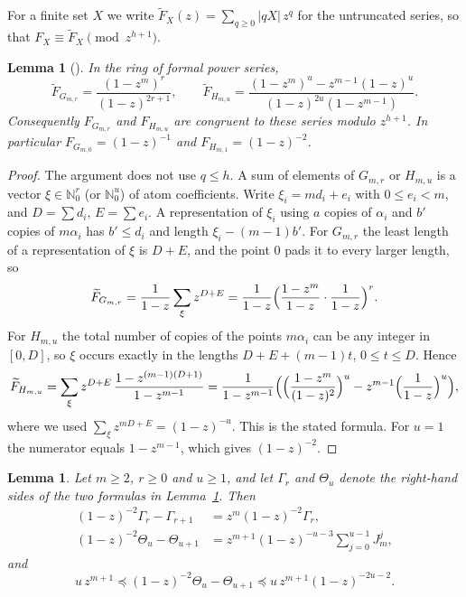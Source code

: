 \documentclass[11pt]{amsart}
\newtheorem{lemma}[theorem]{Lemma}
\theoremstyle{definition}
\theoremstyle{remark}
\numberwithin{equation}{section}
\newcommand{\N}{\mathbb{N}}
\newcommand{\cle}{\preceq}
\begin{document}
For a finite set $X$ we write $\widetilde F_X(z)=\sum_{q\ge0}|qX|\,z^q$ for the untruncated series, so that $F_X\equiv\widetilde F_X\pmod{z^{h+1}}$.

\begin{lemma}[{\cite[Lemmas~3.3 and~3.4]{PC}}]\label{lem:oGH}
In the ring of formal power series,
\[
\widetilde F_{G_{m,r}}=\frac{(1-z^m)^r}{(1-z)^{2r+1}},\qquad \widetilde F_{H_{m,u}}=\frac{(1-z^m)^u-z^{m-1}(1-z)^u}{(1-z)^{2u}(1-z^{m-1})}.
\]
Consequently $F_{G_{m,r}}$ and $F_{H_{m,u}}$ are congruent to these series modulo $z^{h+1}$. In particular $F_{G_{m,0}}=(1-z)^{-1}$ and $F_{H_{m,1}}=(1-z)^{-2}$.
\end{lemma}

\begin{proof}
The argument does not use $q\le h$. A sum of elements of $G_{m,r}$ or $H_{m,u}$ is a vector $\xi\in\N_0^r$ (or $\N_0^u$) of atom coefficients. Write $\xi_i=md_i+e_i$ with $0\le e_i<m$, and $D=\sum d_i$, $E=\sum e_i$. A representation of $\xi_i$ using $a$ copies of $\alpha_i$ and $b'$ copies of $m\alpha_i$ has $b'\le d_i$ and length $\xi_i-(m-1)b'$. For $G_{m,r}$ the least length of a representation of $\xi$ is $D+E$, and the point $0$ pads it to every larger length, so
\[
\widetilde F_{G_{m,r}}=\frac1{1-z}\sum_\xi z^{D+E}=\frac1{1-z}\Bigl(\frac{1-z^m}{1-z}\cdot\frac1{1-z}\Bigr)^r.
\]
For $H_{m,u}$ the total number of copies of the points $m\alpha_i$ can be any integer in $[0,D]$, so $\xi$ occurs exactly in the lengths $D+E+(m-1)t$, $0\le t\le D$. Hence
\[
\widetilde F_{H_{m,u}}=\sum_\xi z^{D+E}\,\frac{1-z^{(m-1)(D+1)}}{1-z^{m-1}}=\frac{1}{1-z^{m-1}}\Bigl(\Bigl(\frac{1-z^m}{(1-z)^2}\Bigr)^u-z^{m-1}\Bigl(\frac{1}{1-z}\Bigr)^u\Bigr),
\]
where we used $\sum_\xi z^{mD+E}=(1-z)^{-u}$. This is the stated formula. For $u=1$ the numerator equals $1-z^{m-1}$, which gives $(1-z)^{-2}$.
\end{proof}

\begin{lemma}\label{lem:odiff}
Let $m\ge 2$, $r\ge 0$ and $u\ge 1$, and let $\Gamma_r$ and $\Theta_u$ denote the right-hand sides of the two formulas in Lemma~\ref{lem:oGH}. Then
\begin{align}
(1-z)^{-2}\Gamma_r-\Gamma_{r+1}&=z^m(1-z)^{-2}\Gamma_r,\label{eq:oGdiff}\\
(1-z)^{-2}\Theta_u-\Theta_{u+1}&=z^{m+1}(1-z)^{-u-3}\sum_{j=0}^{u-1}J_m^j,\label{eq:oHdiff}
\end{align}
and
\begin{equation}\label{eq:oHbounds}
u\,z^{m+1}\cle(1-z)^{-2}\Theta_u-\Theta_{u+1}\cle u\,z^{m+1}(1-z)^{-2u-2}.
\end{equation}
\end{lemma}
\end{document}
